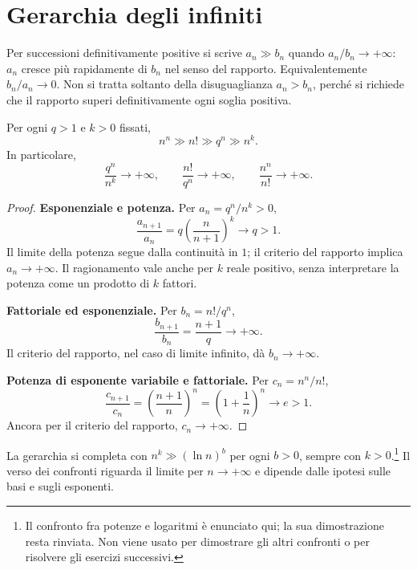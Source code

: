 \section{Gerarchia degli infiniti}
\label{sec:gerarchia-infiniti}

Per successioni definitivamente positive si scrive $a_n\gg b_n$ quando $a_n/b_n\to+\infty$: $a_n$ cresce più rapidamente di $b_n$ nel senso del rapporto. Equivalentemente $b_n/a_n\to0$. Non si tratta soltanto della disuguaglianza $a_n>b_n$, perché si richiede che il rapporto superi definitivamente ogni soglia positiva.

\begin{proposizione}
Per ogni $q>1$ e $k>0$ fissati,
\[
n^n\gg n!\gg q^n\gg n^k.
\]
In particolare,
\[
\frac{q^n}{n^k}\to+\infty,\qquad
\frac{n!}{q^n}\to+\infty,\qquad
\frac{n^n}{n!}\to+\infty.
\]
\end{proposizione}
\begin{proof}
\textbf{Esponenziale e potenza.} Per $a_n=q^n/n^k>0$,
\[
\frac{a_{n+1}}{a_n}=q\left(\frac n{n+1}\right)^k\longrightarrow q>1.
\]
Il limite della potenza segue dalla continuità in $1$; il criterio del rapporto implica $a_n\to+\infty$. Il ragionamento vale anche per $k$ reale positivo, senza interpretare la potenza come un prodotto di $k$ fattori.

\textbf{Fattoriale ed esponenziale.} Per $b_n=n!/q^n$,
\[
\frac{b_{n+1}}{b_n}=\frac{n+1}{q}\longrightarrow+\infty.
\]
Il criterio del rapporto, nel caso di limite infinito, dà $b_n\to+\infty$.

\textbf{Potenza di esponente variabile e fattoriale.} Per $c_n=n^n/n!$,
\[
\frac{c_{n+1}}{c_n}
=\left(\frac{n+1}{n}\right)^n
=\left(1+\frac1n\right)^n\longrightarrow e>1.
\]
Ancora per il criterio del rapporto, $c_n\to+\infty$.
\end{proof}

La gerarchia si completa con $n^k\gg(\ln n)^b$ per ogni $b>0$, sempre con $k>0$.\footnote{Il confronto fra potenze e logaritmi è enunciato qui; la sua dimostrazione resta rinviata. Non viene usato per dimostrare gli altri confronti o per risolvere gli esercizi successivi.} Il verso dei confronti riguarda il limite per $n\to+\infty$ e dipende dalle ipotesi sulle basi e sugli esponenti.

